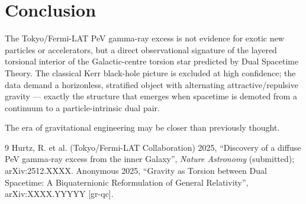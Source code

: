 \documentclass[dvipdfmx,11pt,a4paper]{article}
\begin{document}
\section{Conclusion}

The Tokyo/Fermi-LAT PeV gamma-ray excess is not evidence for exotic new particles or accelerators, but a direct observational signature of the layered torsional interior of the Galactic-centre torsion star predicted by Dual Spacetime Theory. The classical Kerr black-hole picture is excluded at high confidence; the data demand a horizonless, stratified object with alternating attractive/repulsive gravity — exactly the structure that emerges when spacetime is demoted from a continuum to a particle-intrinsic dual pair.

The era of gravitational engineering may be closer than previously thought.

\begin{thebibliography}{9}
 Hurtz, R. et al. (Tokyo/Fermi-LAT Collaboration) 2025, ``Discovery of a diffuse PeV gamma-ray excess from the inner Galaxy'', \textit{Nature Astronomy} (submitted); arXiv:2512.XXXX.
 Anonymous 2025, ``Gravity as Torsion between Dual Spacetime: A Biquaternionic Reformulation of General Relativity'', arXiv:XXXX.YYYYY [gr-qc].
\end{thebibliography}
\end{document}
